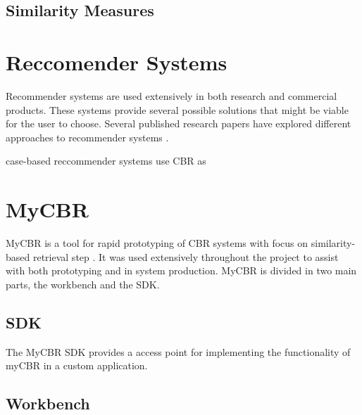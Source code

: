 \subsection{Similarity Measures}






\section{Reccomender Systems}
Recommender systems are used extensively in both research and commercial products. These systems provide several possible solutions that might be viable for the user to choose. Several published research papers have explored different approaches to recommender systems \cite{mulyana2015case}\cite{quijano2011happy} \cite{}.

case-based reccommender systems use CBR as



\section{MyCBR}
MyCBR is a tool for rapid prototyping of CBR systems with focus on similarity-based retrieval step \cite{MyCBR}. It was used extensively throughout the project to assist with both prototyping and in system production. MyCBR is divided in two main parts, the workbench and the SDK. 


\subsection{SDK}
The MyCBR SDK provides a access point for implementing the functionality of myCBR in a custom application. 


\subsection{Workbench}


\cleardoublepage